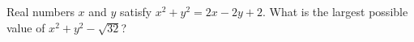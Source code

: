 Real numbers $x$ and $y$ satisfy $x^2+y^2=2x-2y+2$. What is the largest possible value of $x^2+y^2-\sqrt{32}$?

